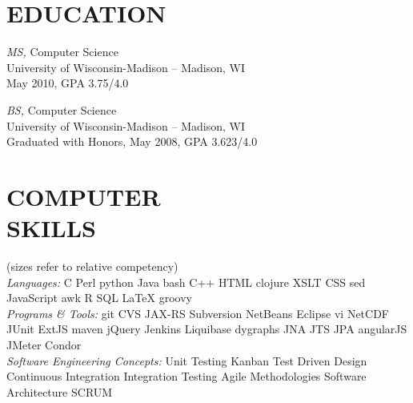 \documentclass[line,margin]{res}
\begin{document}
\address{1010 Gammon Ln \#1, Madison, WI 53719}
\address{email: jwalker@uwalumni.com | phone: 608.370.1908}
 
\begin{resume}
 
\section{EDUCATION} {\sl MS,} Computer Science \\
        	     	University of Wisconsin-Madison -- Madison, WI \\ 
                	May 2010, GPA 3.75/4.0

		{\sl BS,} Computer Science \\
		University of Wisconsin-Madison -- Madison, WI \\
		Graduated with Honors, May 2008, GPA 3.623/4.0

\section{COMPUTER \\ SKILLS} {\small (sizes refer to relative competency)} \\
{\sl Languages:} {\tiny C} {\Large Perl} {\small python} {\huge Java} {\large bash} {\tiny C++} {\large HTML}  {\tiny clojure} {\large XSLT} {\normalsize CSS} {\small sed} {\LARGE JavaScript} {\small awk} {\Large R} {\normalsize SQL} {\large \LaTeX} {\small groovy}  \\
                {\sl Programs \& Tools:}  {\huge git} {\small CVS} {\normalsize JAX-RS} {\normalsize Subversion} {\large NetBeans} {\small Eclipse} {\Large vi} {\LARGE NetCDF} {\large JUnit}  {\normalsize ExtJS} {\huge maven} {\large jQuery} {\Large Jenkins} {\large Liquibase} {\Large dygraphs} {\large JNA} {\large JTS} {\small JPA} {\large angularJS} {\small JMeter} {\large Condor} \\
                {\sl Software Engineering Concepts:} {\Large Unit Testing} {\normalsize Kanban} {\large Test Driven Design} {\huge Continuous Integration} {\normalsize Integration Testing} {\large Agile Methodologies} {\LARGE Software Architecture} {\large SCRUM}
 

\end{resume}
\end{document}
